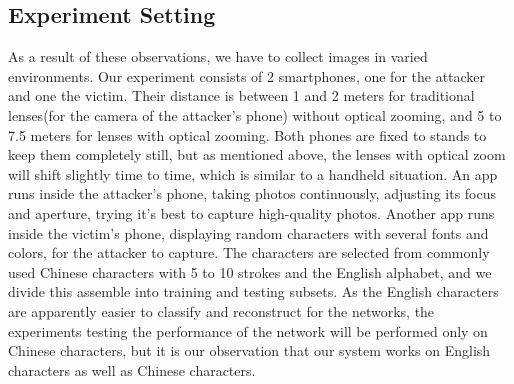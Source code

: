 \subsection{Experiment Setting}
As a result of these observations, we have to collect images in varied environments. Our experiment consists of 2 smartphones, one for the attacker and one the victim. Their distance is between 1 and 2 meters for traditional lenses(for the camera of the attacker's phone) without optical zooming, and 5 to 7.5 meters for lenses with optical zooming. Both phones are fixed to stands to keep them completely still, but as mentioned above, the lenses with optical zoom will shift slightly time to time, which is similar to a handheld situation. An app runs inside the attacker's phone, taking photos continuously, adjusting its focus and aperture, trying it's best to capture high-quality photos. Another app runs inside the victim's phone, displaying random characters with several fonts and colors, for the attacker to capture. The characters are selected from commonly used Chinese characters with 5 to 10 strokes and the English alphabet, and we divide this assemble into training and testing subsets. As the English characters are apparently easier to classify and reconstruct for the networks, the experiments testing the performance of the network will be performed only on Chinese characters, but it is our observation that our system works on English characters as well as Chinese characters.

